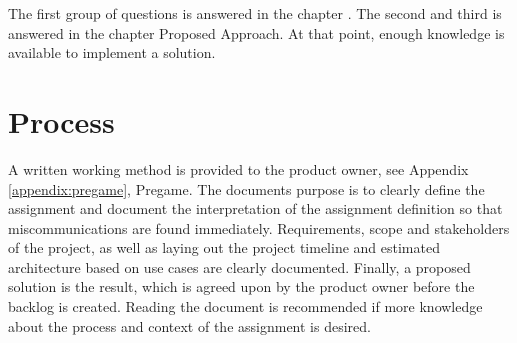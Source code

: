 The first group of questions is answered in the chapter . The second and third is answered in the chapter Proposed Approach. At that point, enough knowledge is available to implement a solution.

\section{Process}

A written working method is provided to the product owner, see Appendix \ref{appendix:pregame}, Pregame. The documents purpose is to clearly define the assignment and document the interpretation of the assignment definition so that miscommunications are found immediately. Requirements, scope and stakeholders of the project, as well as laying out the project timeline and estimated architecture based on use cases are clearly documented. Finally, a proposed solution is the result, which is agreed upon by the product owner before the backlog is created. Reading the document is recommended if more knowledge about the process and context of the assignment is desired.
